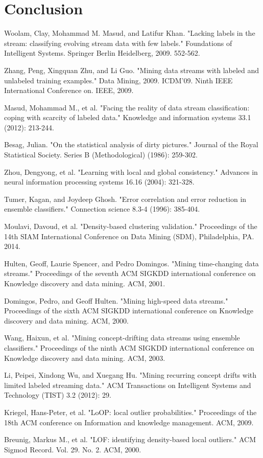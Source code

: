 \documentclass[12pt,a4paper,oneside]{report}
\begin{document}
\section*{Conclusion}
\begin{thebibliography}{20}

Woolam, Clay, Mohammad M. Masud, and Latifur Khan. "Lacking labels in the stream: classifying evolving stream data with few labels." Foundations of Intelligent Systems. Springer Berlin Heidelberg, 2009. 552-562.

Zhang, Peng, Xingquan Zhu, and Li Guo. "Mining data streams with labeled and unlabeled training examples." Data Mining, 2009. ICDM'09. Ninth IEEE International Conference on. IEEE, 2009.

Masud, Mohammad M., et al. "Facing the reality of data stream classification: coping with scarcity of labeled data." Knowledge and information systems 33.1 (2012): 213-244.

Besag, Julian. "On the statistical analysis of dirty pictures." Journal of the Royal Statistical Society. Series B (Methodological) (1986): 259-302.

Zhou, Dengyong, et al. "Learning with local and global consistency." Advances in neural information processing systems 16.16 (2004): 321-328.

Tumer, Kagan, and Joydeep Ghosh. "Error correlation and error reduction in ensemble classifiers." Connection science 8.3-4 (1996): 385-404.

Moulavi, Davoud, et al. "Density-based clustering validation." Proceedings of the 14th SIAM International Conference on Data Mining (SDM), Philadelphia, PA. 2014.

Hulten, Geoff, Laurie Spencer, and Pedro Domingos. "Mining time-changing data streams." Proceedings of the seventh ACM SIGKDD international conference on Knowledge discovery and data mining. ACM, 2001.

Domingos, Pedro, and Geoff Hulten. "Mining high-speed data streams." Proceedings of the sixth ACM SIGKDD international conference on Knowledge discovery and data mining. ACM, 2000.

Wang, Haixun, et al. "Mining concept-drifting data streams using ensemble classifiers." Proceedings of the ninth ACM SIGKDD international conference on Knowledge discovery and data mining. ACM, 2003.

Li, Peipei, Xindong Wu, and Xuegang Hu. "Mining recurring concept drifts with limited labeled streaming data." ACM Transactions on Intelligent Systems and Technology (TIST) 3.2 (2012): 29.

Kriegel, Hans-Peter, et al. "LoOP: local outlier probabilities." Proceedings of the 18th ACM conference on Information and knowledge management. ACM, 2009.

Breunig, Markus M., et al. "LOF: identifying density-based local outliers." ACM Sigmod Record. Vol. 29. No. 2. ACM, 2000.

\end{thebibliography}
\end{document}
